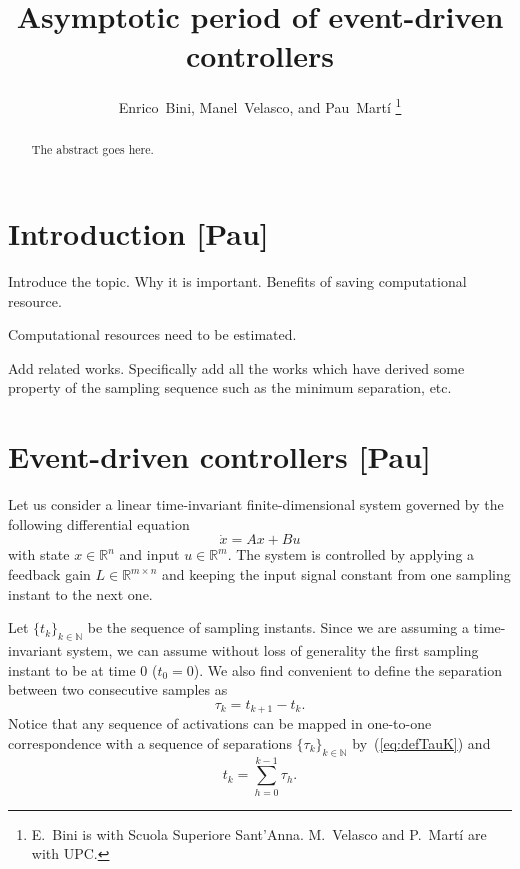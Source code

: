 \documentclass[12pt,draftcls,onecolumn]{IEEEtran} %
\newcommand{\RR}{\mathbb{R}}
\newcommand{\NN}{\mathbb{N}}
\begin{document}
\title{Asymptotic period of event-driven controllers}

\author{Enrico~Bini, Manel~Velasco, and Pau~Mart\'i%
  \thanks{E.~Bini is with Scuola Superiore Sant'Anna. M.~Velasco and
    P.~Mart\'i are with UPC.}}

\maketitle

\begin{abstract}
  The abstract goes here.
\end{abstract}






\section{Introduction [Pau]}
\label{sec:intro}

Introduce the topic. Why it is important. Benefits of saving
computational resource.

Computational resources need to be estimated.

Add related works. Specifically add all the works which have derived
some property of the sampling sequence such as the minimum separation,
etc.


\section{Event-driven controllers [Pau]}
\label{sec:event}

Let us consider a linear time-invariant finite-dimensional system
governed by the following differential equation
\begin{equation}
  \label{eq:sysDifEq}
  \dot x=Ax+Bu
\end{equation}
with state $x\in\RR^n$ and input $u\in\RR^m$. The system is controlled
by applying a feedback gain $L\in\RR^{m\times n}$ and keeping the
input signal constant from one sampling instant to the next one.

Let $\{t_k\}_{k\in\NN}$ be the sequence of sampling instants.  Since
we are assuming a time-invariant system, we can assume without loss of
generality the first sampling instant to be at time $0$ ($t_0=0$). We
also find convenient to define the separation between two consecutive
samples as
\begin{equation}
  \label{eq:defTauK}
  \tau_k=t_{k+1}-t_k.
\end{equation}
Notice that any sequence of activations can be mapped in one-to-one
correspondence with a sequence of separations
$\{\tau_k\}_{k\in\NN}$ by~(\ref{eq:defTauK}) and
\begin{equation}
  \label{eq:tauKtoTk}
  t_k=\sum_{h=0}^{k-1}\tau_h.
\end{equation}
\end{document}
